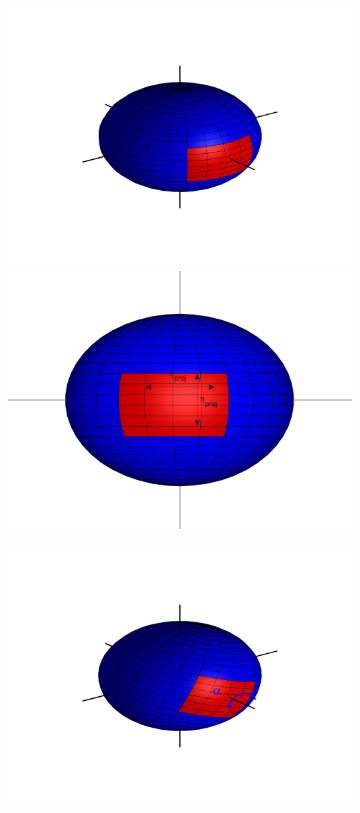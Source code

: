 \documentclass{pnastwo}
\begin{document}
\begin{figure}
\begin{subfigure}{0.2\textwidth}
\includegraphics[width=\textwidth]{sphere_1}
\includegraphics[width=\textwidth]{sphere2_1}
\caption{}
\end{subfigure}
\begin{subfigure}{0.2\textwidth}
\includegraphics[width=\textwidth]{sphere_2}

\end{subfigure}
\end{figure}
\end{document}
